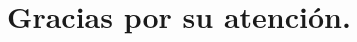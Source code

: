 {

\title[Gracias por su atención]{Gracias por su atención.}
\subtitle{}
\author{}
\institute{}
\date{}
\begin{frame}
    \titlepage
\end{frame}
}	
